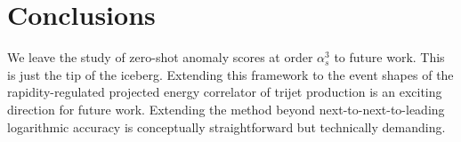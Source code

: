 \section{Conclusions}\label{sec:conclusions}

We leave the study of zero-shot anomaly scores at order $\alpha_s^3$ to
future work. This is just the tip of the iceberg. Extending this
framework to the event shapes of the rapidity-regulated projected energy
correlator of trijet production is an exciting direction for future
work. Extending the method beyond next-to-next-to-leading logarithmic
accuracy is conceptually straightforward but technically demanding.

